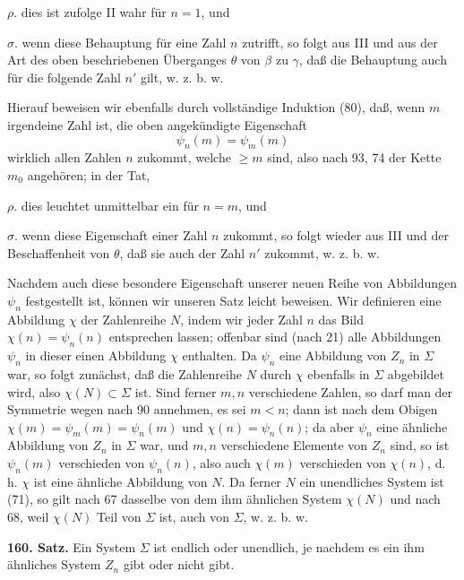 \documentclass[11pt]{article}
\newcommand{\partof}{\mathrel{\subset}}
\begin{document}
\noindent $\rho.$ dies ist zufolge II wahr für $n=1$, und

\noindent $\sigma.$ wenn diese Behauptung für eine Zahl $n$ zutrifft, so folgt aus III und aus der Art des oben beschriebenen Überganges $\theta$ von $\beta$ zu $\gamma$, daß die Behauptung auch für die folgende Zahl $n'$ gilt, w. z. b. w.

Hierauf beweisen wir ebenfalls durch vollständige Induktion (80), daß, wenn $m$ irgendeine Zahl ist, die oben angekündigte Eigenschaft
\[
\psi_n(m)=\psi_m(m)
\]
wirklich allen Zahlen $n$ zukommt, welche $\geq m$ sind, also nach 93, 74 der Kette $m_0$ angehören; in der Tat,

\noindent $\rho.$ dies leuchtet unmittelbar ein für $n=m$, und

\noindent $\sigma.$ wenn diese Eigenschaft einer Zahl $n$ zukommt, so folgt wieder aus III und der Beschaffenheit von $\theta$, daß sie auch der Zahl $n'$ zukommt, w. z. b. w.

Nachdem auch diese besondere Eigenschaft unserer neuen Reihe von Abbildungen $\psi_n$ festgestellt ist, können wir unseren Satz leicht beweisen. Wir definieren eine Abbildung $\chi$ der Zahlenreihe $N$, indem wir jeder Zahl $n$ das Bild $\chi(n)=\psi_n(n)$ entsprechen lassen; offenbar sind (nach 21) alle Abbildungen $\psi_n$ in dieser einen Abbildung $\chi$ enthalten. Da $\psi_n$ eine Abbildung von $Z_n$ in $\Sigma$ war, so folgt zunächst, daß die Zahlenreihe $N$ durch $\chi$ ebenfalls in $\Sigma$ abgebildet wird, also $\chi(N)\partof\Sigma$ ist. Sind ferner $m,n$ verschiedene Zahlen, so darf man der Symmetrie wegen nach 90 annehmen, es sei $m<n$; dann ist nach dem Obigen $\chi(m)=\psi_m(m)=\psi_n(m)$ und $\chi(n)=\psi_n(n)$; da aber $\psi_n$ eine ähnliche Abbildung von $Z_n$ in $\Sigma$ war, und $m,n$ verschiedene Elemente von $Z_n$ sind, so ist $\psi_n(m)$ verschieden von $\psi_n(n)$, also auch $\chi(m)$ verschieden von $\chi(n)$, d. h. $\chi$ ist eine ähnliche Abbildung von $N$. Da ferner $N$ ein unendliches System ist (71), so gilt nach 67 dasselbe von dem ihm ähnlichen System $\chi(N)$ und nach 68, weil $\chi(N)$ Teil von $\Sigma$ ist, auch von $\Sigma$, w. z. b. w.

\noindent\textbf{160. Satz.} Ein System $\Sigma$ ist endlich oder unendlich, je nachdem es ein ihm ähnliches System $Z_n$ gibt oder nicht gibt.
\end{document}
